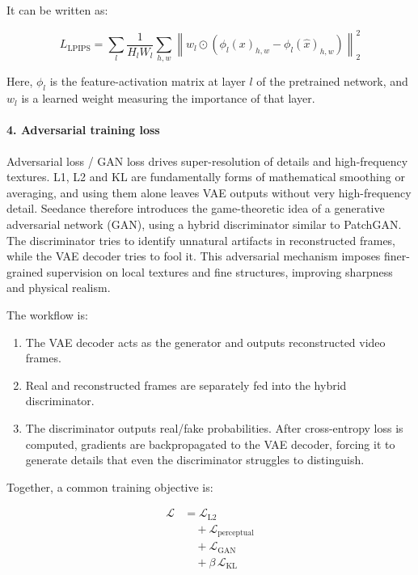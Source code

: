 It can be written as:

\[
L_{\mathrm{LPIPS}} =
\sum_l
\frac{1}{H_l W_l}
\sum_{h,w}
\left\|
w_l\odot
\left(
\phi_l(x)_{h,w}-\phi_l(\hat{x})_{h,w}
\right)
\right\|_2^2
\]

Here, \(\phi_l\) is the feature-activation matrix at layer \(l\) of the pretrained network, and \(w_l\) is a learned weight measuring the importance of that layer.

\hypertarget{adversarial-training-loss}{%
\paragraph{4. Adversarial training loss}\label{adversarial-training-loss}}

Adversarial loss / GAN loss drives super-resolution of details and high-frequency textures. L1, L2 and KL are fundamentally forms of mathematical smoothing or averaging, and using them alone leaves VAE outputs without very high-frequency detail. Seedance therefore introduces the game-theoretic idea of a generative adversarial network (GAN), using a hybrid discriminator similar to PatchGAN. The discriminator tries to identify unnatural artifacts in reconstructed frames, while the VAE decoder tries to fool it. This adversarial mechanism imposes finer-grained supervision on local textures and fine structures, improving sharpness and physical realism.

The workflow is:

\begin{enumerate}
\def\labelenumi{\arabic{enumi}.}
\tightlist
\item
  The VAE decoder acts as the generator and outputs reconstructed video frames.
\item
  Real and reconstructed frames are separately fed into the hybrid discriminator.
\item
  The discriminator outputs real/fake probabilities. After cross-entropy loss is computed, gradients are backpropagated to the VAE decoder, forcing it to generate details that even the discriminator struggles to distinguish.
\end{enumerate}

Together, a common training objective is:

\[
\begin{aligned}
\mathcal{L}
&= \mathcal{L}_{\mathrm{L2}}
\\
&\quad + \mathcal{L}_{\mathrm{perceptual}}
\\
&\quad + \mathcal{L}_{\mathrm{GAN}}
\\
&\quad + \beta\,\mathcal{L}_{\mathrm{KL}}
\end{aligned}
\]

